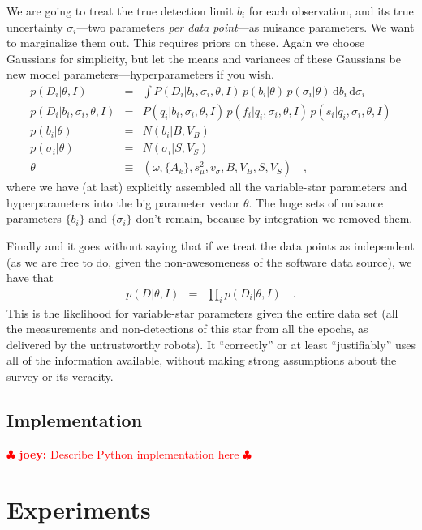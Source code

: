 \documentclass[12pt,preprint]{aastex}
\newcommand{\dd}{\mathrm{d}}
\newcommand{\joey}[1] { \textcolor{red} {
\ensuremath{\clubsuit} {\bf joey:}  {#1}
\ensuremath{\clubsuit} } }%
\begin{document}
We are going to treat the true detection limit $b_i$ for each
observation, and its true uncertainty $\sigma_i$---two parameters
\emph{per data point}---as nuisance parameters.  We want to
marginalize them out.  This requires priors on these.  Again we choose
Gaussians for simplicity, but let the means and variances of these
Gaussians be new model parameters---hyperparameters if you wish.
\begin{eqnarray}\displaystyle
p(D_i|\theta,I) &=&
  \int P(D_i|b_i,\sigma_i,\theta,I)\,p(b_i|\theta)\,p(\sigma_i|\theta)\,\dd b_i\,\dd\sigma_i
\\
p(D_i|b_i,\sigma_i,\theta,I) &=&
  P(q_i|b_i,\sigma_i,\theta,I)\,p(f_i|q_i,\sigma_i,\theta,I)\,p(s_i|q_i,\sigma_i,\theta,I)
\\
p(b_i|\theta) &=& N(b_i|B,V_B)
\\
p(\sigma_i|\theta) &=& N(\sigma_i|S,V_S)
\\
\theta &\equiv& (\omega, \{A_k\}, s_\mu^2, v_\sigma, B, V_B, S, V_S)
\quad,
\end{eqnarray}
where we have (at last) explicitly assembled all the variable-star
parameters and hyperparameters into the big parameter vector $\theta$.
The huge sets of nuisance parameters $\{b_i\}$ and
$\{\sigma_i\}$ don't remain, because by integration we
removed them.

Finally and it goes without saying that if we treat the data points as
independent (as we are free to do, given the non-awesomeness of the
software data source), we have that
\begin{eqnarray}\displaystyle
p(D|\theta,I) &=& \prod_i p(D_i|\theta,I)
\quad.
\end{eqnarray}
This is the likelihood for variable-star parameters given the entire
data set (all the measurements and non-detections of this star from
all the epochs, as delivered by the untrustworthy robots).  It
``correctly'' or at least ``justifiably'' uses all of the information
available, without making strong assumptions about the survey or its
veracity.


\subsection{Implementation}
\label{ss:implemenation}



\joey{Describe Python implementation here}




\section{Experiments}
\label{sec:experiments}
\end{document}
